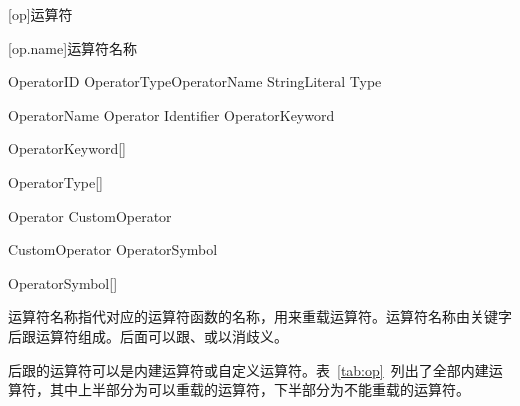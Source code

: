 
[op]{运算符}

[op.name]{运算符名称}

\begin{bnf}{OperatorID}
     OperatorType\bnfq OperatorName \br
     StringLiteral \br
     \terminal{\$} \br
      \br
      Type
\end{bnf}

\begin{bnf}{OperatorName}
    Operator \br
    Identifier \br
    OperatorKeyword \br
    \terminal{(} \terminal{)} \br
    \terminal{[} \terminal{]}
\end{bnf}

\begin{bnf}{OperatorKeyword}[\oneof]
\end{bnf}

\begin{bnf}{OperatorType}[\oneof]
\end{bnf}

\begin{bnf}{Operator}
    CustomOperator \br
    \terminal{;}
\end{bnf}

\begin{bnf}{CustomOperator}
    OperatorSymbol\bnfp
\end{bnf}

\begin{bnf}{OperatorSymbol}[\oneof]
\end{bnf}


\pnum
运算符名称指代对应的运算符函数的名称，用来重载运算符。运算符名称由关键字后跟运算符组成。后面可以跟、或以消歧义。

\pnum
{}后跟的运算符可以是内建运算符或自定义运算符。表~\ref{tab:op}~列出了全部内建运算符，其中上半部分为可以重载的运算符，下半部分为不能重载的运算符。


